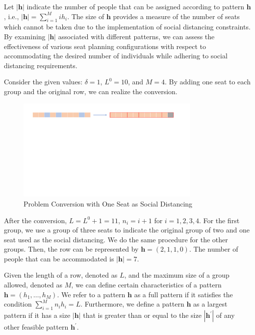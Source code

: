 Let $|\bm{h}|$ indicate the number of people that can be assigned according to pattern $\bm{h}$, i.e., $|\bm{h}| = \sum_{i =1}^{M} i h_i$. The size of $\bm{h}$ provides a measure of the number of seats which cannot be taken due to the implementation of social distancing constraints. By examining $|\bm{h}|$ associated with different patterns, we can assess the effectiveness of various seat planning configurations with respect to accommodating the desired number of individuals while adhering to social distancing requirements.

\begin{example}
Consider the given values: $\delta = 1$, $L^{0} = 10$, and $M = 4$. By adding one seat to each group and the original row, we can realize the conversion.

\begin{figure}[ht]
    \centering
        \includegraphics[width=0.8\textwidth]{./Figures/dummy_seat.pdf}
    \caption{Problem Conversion with One Seat as Social Distancing}
\end{figure}

After the conversion, $L = L^{0} + 1 =11$, $n_i = i + 1$ for $i = 1, 2, 3, 4$. For the first group, we use a group of three seats to indicate the original group of two and one seat used as the social distancing. We do the same procedure for the other groups. Then, the row can be represented by $\bm{h} = (2,1,1,0)$. The number of people that can be accommodated is $|\bm{h}| = 7$.

\end{example}


\begin{definition}
Given the length of a row, denoted as $L$, and the maximum size of a group allowed, denoted as $M$, we can define certain characteristics of a pattern $\bm{h} = (h_1, \ldots, h_M)$.
We refer to a pattern $\bm{h}$ as a full pattern if it satisfies the condition $\sum_{i=1}^{M} n_i h_i = L$. Furthermore, we define a pattern $\bm{h}$ as a largest pattern if it has a size $|\bm{h}|$ that is greater than or equal to the size $|\bm{h}^{\prime}|$ of any other feasible pattern $\bm{h}^{\prime}$.
\end{definition}

